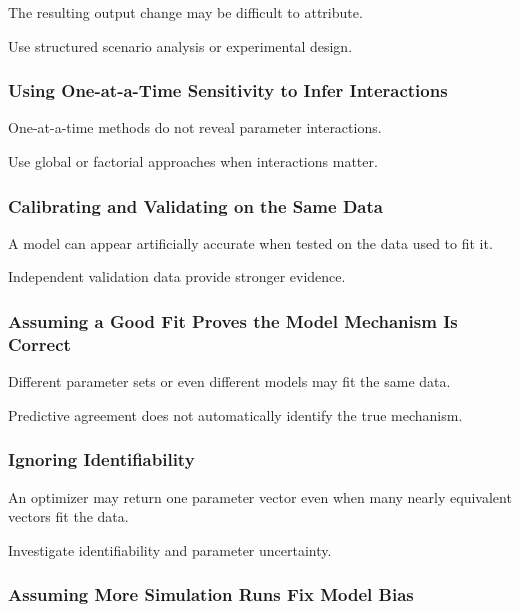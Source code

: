 The resulting output change may be difficult to attribute.

Use structured scenario analysis or experimental design.

\subsubsection{Using One-at-a-Time Sensitivity to Infer Interactions}

One-at-a-time methods do not reveal parameter interactions.

Use global or factorial approaches when interactions matter.

\subsubsection{Calibrating and Validating on the Same Data}

A model can appear artificially accurate when tested on the data used to
fit it.

Independent validation data provide stronger evidence.

\subsubsection{Assuming a Good Fit Proves the Model Mechanism Is Correct}

Different parameter sets or even different models may fit the same data.

Predictive agreement does not automatically identify the true mechanism.

\subsubsection{Ignoring Identifiability}

An optimizer may return one parameter vector even when many nearly
equivalent vectors fit the data.

Investigate identifiability and parameter uncertainty.

\subsubsection{Assuming More Simulation Runs Fix Model Bias}

